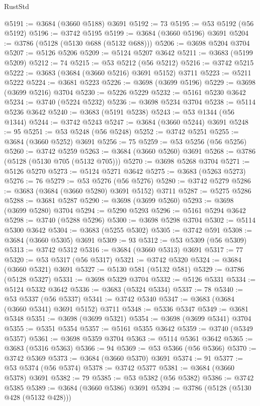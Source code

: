 \begin{lexlean}{RustStd}
\begin{coremodule}
@5191 := @3684 (@3660 @5188) @3691
@5192 := 73
@5195 := @53 @5192 (@56 @5192)
@5196 := @3742 @5195
@5199 := @3684 (@3660 @5196) @3691
@5204 := @3786 (@5128 (@5130 @688 (@5132 @688)))
@5206 := @3698 @5204 @3704
@5207 := @5126 @5206
@5209 := @5124 @5207 @3642
@5211 := @3683 (@5199 @5209)
@5212 := 74
@5215 := @53 @5212 (@56 @5212)
@5216 := @3742 @5215
@5222 := @3683 (@3684 (@3660 @5216) @3691 @5152) @3711
@5223 := @5211 @5222
@5224 := @3681 @5223
@5226 := @3698 (@3699 @5196)
@5229 := @3698 (@3699 @5216) @3704
@5230 := @5226 @5229
@5232 := @5161 @5230 @3642
@5234 := @3740 (@5224 @5232)
@5236 := @3698 @5234 @3704
@5238 := @5114 @5236 @3642
@5240 := @3683 (@5191 @5238)
@5243 := @53 @1344 (@56 @1344)
@5244 := @3742 @5243
@5247 := @3684 (@3660 @5244) @3691
@5248 := 95
@5251 := @53 @5248 (@56 @5248)
@5252 := @3742 @5251
@5255 := @3684 (@3660 @5252) @3691
@5256 := 75
@5259 := @53 @5256 (@56 @5256)
@5260 := @3742 @5259
@5263 := @3684 (@3660 @5260) @3691
@5268 := @3786 (@5128 (@5130 @705 (@5132 @705)))
@5270 := @3698 @5268 @3704
@5271 := @5126 @5270
@5273 := @5124 @5271 @3642
@5275 := @3683 (@5263 @5273)
@5276 := 76
@5279 := @53 @5276 (@56 @5276)
@5280 := @3742 @5279
@5286 := @3683 (@3684 (@3660 @5280) @3691 @5152) @3711
@5287 := @5275 @5286
@5288 := @3681 @5287
@5290 := @3698 (@3699 @5260)
@5293 := @3698 (@3699 @5280) @3704
@5294 := @5290 @5293
@5296 := @5161 @5294 @3642
@5298 := @3740 (@5288 @5296)
@5300 := @3698 @5298 @3704
@5302 := @5114 @5300 @3642
@5304 := @3683 (@5255 @5302)
@5305 := @3742 @591
@5308 := @3684 (@3660 @5305) @3691
@5309 := 93
@5312 := @53 @5309 (@56 @5309)
@5313 := @3742 @5312
@5316 := @3684 (@3660 @5313) @3691
@5317 := 77
@5320 := @53 @5317 (@56 @5317)
@5321 := @3742 @5320
@5324 := @3684 (@3660 @5321) @3691
@5327 := @5130 @581 (@5132 @581)
@5329 := @3786 (@5128 @5327)
@5331 := @3698 @5329 @3704
@5332 := @5126 @5331
@5334 := @5124 @5332 @3642
@5336 := @3683 (@5324 @5334)
@5337 := 78
@5340 := @53 @5337 (@56 @5337)
@5341 := @3742 @5340
@5347 := @3683 (@3684 (@3660 @5341) @3691 @5152) @3711
@5348 := @5336 @5347
@5349 := @3681 @5348
@5351 := @3698 (@3699 @5321)
@5354 := @3698 (@3699 @5341) @3704
@5355 := @5351 @5354
@5357 := @5161 @5355 @3642
@5359 := @3740 (@5349 @5357)
@5361 := @3698 @5359 @3704
@5363 := @5114 @5361 @3642
@5365 := @3683 (@5316 @5363)
@5366 := 94
@5369 := @53 @5366 (@56 @5366)
@5370 := @3742 @5369
@5373 := @3684 (@3660 @5370) @3691
@5374 := 91
@5377 := @53 @5374 (@56 @5374)
@5378 := @3742 @5377
@5381 := @3684 (@3660 @5378) @3691
@5382 := 79
@5385 := @53 @5382 (@56 @5382)
@5386 := @3742 @5385
@5389 := @3684 (@3660 @5386) @3691
@5394 := @3786 (@5128 (@5130 @428 (@5132 @428)))

\end{coremodule}
\end{lexlean}
